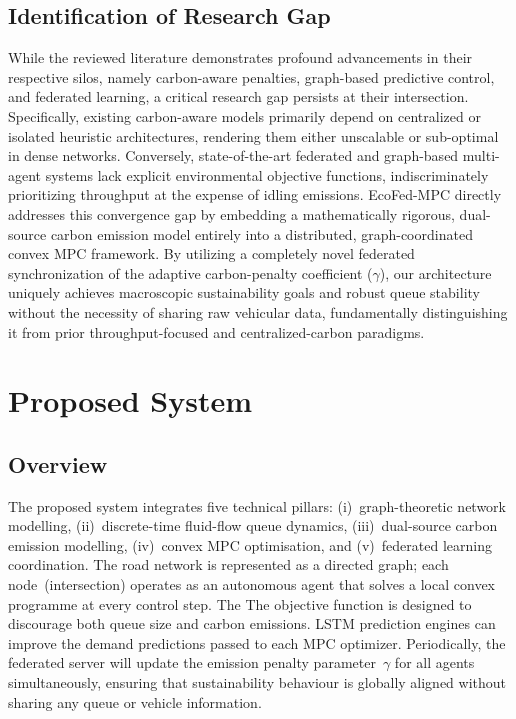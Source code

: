 \documentclass[journal]{IEEEtran}
\begin{document}
\subsection{Identification of Research Gap}
While the reviewed literature demonstrates profound advancements in their respective silos, namely carbon-aware penalties, graph-based predictive control, and federated learning, a critical research gap persists at their intersection. Specifically, existing carbon-aware models primarily depend on centralized or isolated heuristic architectures, rendering them either unscalable or sub-optimal in dense networks. Conversely, state-of-the-art federated and graph-based multi-agent systems lack explicit environmental objective functions, indiscriminately prioritizing throughput at the expense of idling emissions. EcoFed-MPC directly addresses this convergence gap by embedding a mathematically rigorous, dual-source carbon emission model entirely into a distributed, graph-coordinated convex MPC framework. By utilizing a completely novel federated synchronization of the adaptive carbon-penalty coefficient ($\gamma$), our architecture uniquely achieves macroscopic sustainability goals and robust queue stability without the necessity of sharing raw vehicular data, fundamentally distinguishing it from prior throughput-focused and centralized-carbon paradigms.

\section{Proposed System}
\label{sec:proposed}

\subsection{Overview}
The proposed system integrates five technical pillars: (i)~graph-theoretic
network modelling, (ii)~discrete-time fluid-flow queue dynamics,
(iii)~dual-source carbon emission modelling, (iv)~convex MPC optimisation,
and (v)~federated learning coordination.  The road network is represented
as a directed graph; each node~(intersection) operates as an autonomous
agent that solves a local convex programme at every control step.  The
The objective function is designed to discourage both queue size and carbon emissions. LSTM prediction engines can improve the demand predictions passed to each MPC optimizer. Periodically, the federated server will update the emission penalty parameter~$\gamma$ for all agents simultaneously, ensuring that sustainability behaviour is globally aligned without sharing any queue or vehicle information.
\end{document}
